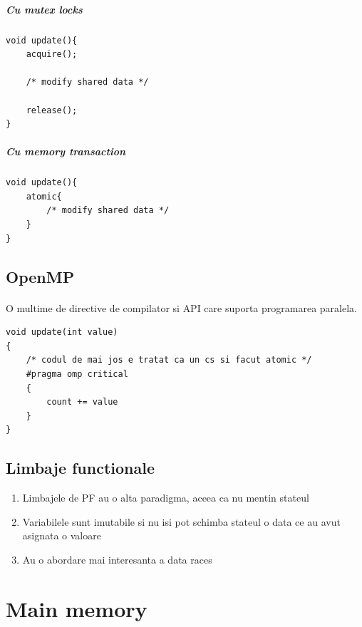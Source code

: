 \documentclass{article}
\begin{document}
\subparagraph*{Cu mutex locks}
\begin{center}
    \begin{lstlisting}
void update(){
    acquire();

    /* modify shared data */

    release();
}
    \end{lstlisting}
\end{center}

\subparagraph*{Cu memory transaction}
\begin{center}
    \begin{lstlisting}
void update(){
    atomic{
        /* modify shared data */
    }
}
    \end{lstlisting}
\end{center}

\subsection*{OpenMP}
\paragraph*{} O multime de directive de compilator si API care suporta programarea paralela.

\begin{center}
    \begin{lstlisting}
void update(int value)
{
    /* codul de mai jos e tratat ca un cs si facut atomic */
    #pragma omp critical
    {
        count += value
    }
}
    \end{lstlisting}
\end{center}

\subsection*{Limbaje functionale}
\begin{enumerate}
    \item Limbajele de PF au o alta paradigma, aceea ca nu mentin stateul
    \item Variabilele sunt imutabile si nu isi pot schimba stateul o data ce au avut asignata o valoare
    \item Au o abordare mai interesanta a data races
\end{enumerate}

\section[Ch9 Main memory]{Main memory}
\end{document}
